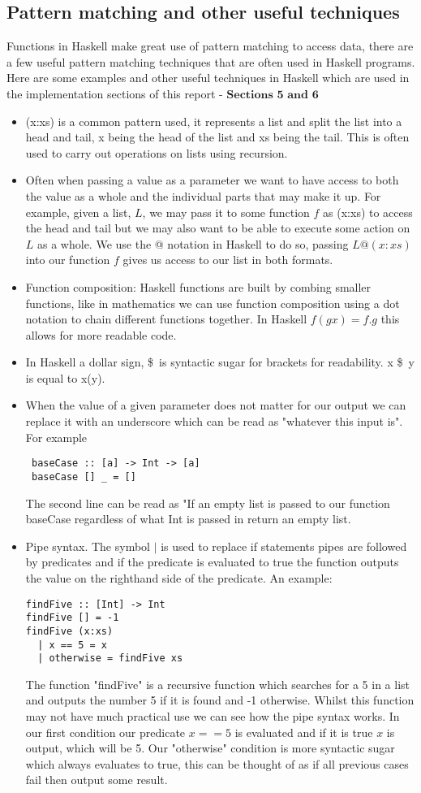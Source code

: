 \documentclass{article}%
\begin{document}
\subsection{Pattern matching and other useful techniques}
Functions in Haskell make great use of pattern matching to access data, there are a few useful pattern matching techniques that are often used in Haskell programs. Here are some examples and other useful techniques in Haskell which are used in the implementation sections of this report - $\textbf{Sections 5 and 6}$ 
\begin{itemize}
\item (x:xs) is a common pattern used, it represents a list and split the list into a head and tail, x being the head of the list and xs being the tail. This is often used to carry out operations on lists using recursion. 
\item Often when passing a value as a parameter we want to have access to both the value as a whole and the individual parts that may make it up. For example, given a list, $L$, we may pass it to some function $f$ as (x:xs) to access the head and tail but we may also want to be able to execute some action on $L$ as a whole. We use the @ notation in Haskell to do so, passing $L@(x:xs)$ into our function $f$ gives us access to our list in both formats. 
\item Function composition: Haskell functions are built by combing smaller functions, like in mathematics we can use function composition using a dot notation to chain different functions together. In Haskell $f (g x) = f . g $ this allows for more readable code. 
\item In Haskell a dollar sign, \$\ is syntactic sugar for brackets for readability. x \$\ y is equal to x(y).
\item When the value of a given parameter does not matter for our output we can replace it with an underscore which can be read as "whatever this input is". For example
\begin{verbatim}
 baseCase :: [a] -> Int -> [a] 
 baseCase [] _ = [] 
\end{verbatim}
The second line can be read as "If an empty list is passed to our function baseCase regardless of what Int is passed in return an empty list.
\item Pipe syntax. The symbol $\vert$ is used to replace if statements pipes are followed by predicates and if the predicate is evaluated to true the function outputs the value on the righthand side of the predicate. An example: 
\begin{verbatim}
findFive :: [Int] -> Int 
findFive [] = -1
findFive (x:xs) 
  | x == 5 = x
  | otherwise = findFive xs 
\end{verbatim}
The function "findFive" is a recursive function which searches for a 5 in a list and outputs the number 5 if it is found and -1 otherwise. Whilst this function may not have much practical use we can see how the pipe syntax works. In our first condition our predicate $x==5$ is evaluated and if it is true $x$ is output, which will be 5. Our "otherwise" condition is more syntactic sugar which always evaluates to true, this can be thought of as if all previous cases fail then output some result. 
\end{itemize}
\end{document}
